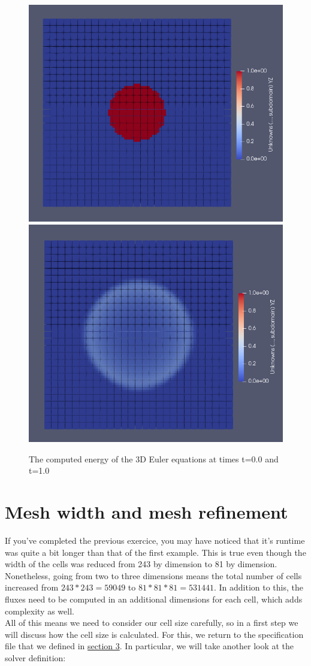 \documentclass[12pt,letterpaper]{article}
\begin{document}
\begin{figure}[!h]
\centering
\includegraphics[width=0.40\linewidth]{pictures/euler3D_start.png}
\includegraphics[width=0.40\linewidth]{pictures/euler3D_end.png}
\caption{The computed energy of the 3D Euler equations at times t=0.0 and t=1.0}
\end{figure}

\newpage

\section{Mesh width and mesh refinement}
\label{refinement}

\vspace{0.2cm}

If you've completed the previous exercice, you may have noticed that it's runtime was quite a bit longer than that of the first example. This is true even though the width of the cells was reduced from 243 by dimension to 81 by dimension. Nonetheless, going from two to three dimensions means the total number of cells increased from $243*243=59049$ to $81*81*81=531441$. In addition to this, the fluxes need to be computed in an additional dimensions for each cell, which adds complexity as well.\\
All of this means we need to consider our cell size carefully, so in a first step we will discuss how the cell size is calculated. For this, we return to the specification file that we defined in \hyperref[section_3]{section 3}. In particular, we will take another look at the solver definition:\\
\end{document}
